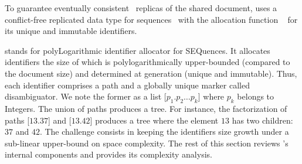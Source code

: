 To guarantee eventually consistent~\cite{bailis2013eventual} replicas of the
shared document, \CRATE uses a conflict-free replicated data type for
sequences~\cite{shapiro2011comprehensive, shapiro2011conflict} with the
allocation function \LSEQ~\cite{nedelec2013concurrency, nedelec2013lseq} for its
unique and immutable identifiers.

\LSEQ stands for polyLogarithmic identifier allocator for SEQuences. It
allocates identifiers the size of which is polylogarithmically upper-bounded
(compared to the document size) and determined at generation (unique and
immutable). Thus, each identifier comprises a path and a globally unique marker
called disambiguator. We note the former as a list [$p_1.p_2\ldots p_k$] where
$p_k$ belongs to Integers. The union of paths produces a tree. For instance, the
factorization of paths [$13.37$] and [$13.42$] produces a tree where the element
$13$ has two children: $37$ and $42$. The challenge consists in keeping the
identifiers size growth under a sub-linear upper-bound on space complexity. The
rest of this section reviews \LSEQ's internal components and provides its
complexity analysis.

